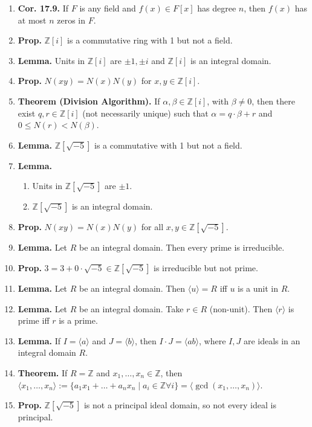 \begin{enumerate}
	\item \textbf{Cor. 17.9. } If $F$ is any field and $f(x) \in F[x]$ has degree $n$, then $f(x)$ has at most $n$ zeros in $F$. 
	\item \textbf{Prop. } $\mathbb{Z}[i]$ is a commutative ring with 1 but not a field. 	
	\item \textbf{Lemma. } Units in $\mathbb{Z}[i]$ are $\pm 1, \pm i$ and $\mathbb{Z}[i]$ is an integral domain. 	
	\item \textbf{Prop. } $N(xy)=N(x)N(y)$ for $x,y \in \mathbb{Z}[i]$. 
	\item \textbf{Theorem (Division Algorithm). } If $\alpha, \beta \in \mathbb{Z}[i]$, with $\beta \neq 0$, then there exist $q,r \in \mathbb{Z}[i]$ (not necessarily unique) such that $\alpha = q \cdot \beta + r$ and $0 \leq N(r) < N(\beta)$. 
	\item \textbf{Lemma. } $\mathbb{Z}[\sqrt{-5}]$ is a commutative with 1 but not a field. 
	\item \textbf{Lemma. } 
	\begin{enumerate}
		\item Units in $\mathbb{Z}[\sqrt{-5}]$ are $\pm 1$. 
		\item $\mathbb{Z}[\sqrt{-5}]$ is an integral domain. 
	\end{enumerate}
	\item \textbf{Prop. } $N(xy) = N(x)N(y)$ for all $x,y \in \mathbb{Z}[\sqrt{-5}]$. 
	\item \textbf{Lemma. } Let $R$ be an integral domain. Then every prime is irreducible. 
	\item \textbf{Prop. } $3 = 3 + 0 \cdot \sqrt{-5} \in \mathbb{Z}[\sqrt{-5}]$ is irreducible but not prime. 
	\item \textbf{Lemma. } Let $R$ be an integral domain. Then $\langle u \rangle = R$ iff $u$ is a unit in $R$. 
	\item \textbf{Lemma. } Let $R$ be an integral domain. Take $r \in R$ (non-unit). Then $\langle r \rangle$ is prime iff $r$ is a prime. 
	\item \textbf{Lemma. } If $I = \langle a \rangle$ and $J = \langle b \rangle$, then $I \cdot J = \langle ab \rangle$, where $I,J$ are ideals in an integral domain $R$. 
	\item \textbf{Theorem. } If $R = \mathbb{Z}$ and $x_1,\dots,x_n \in \mathbb{Z}$, then $\langle x_1,\dots,x_n \rangle := \{a_1x_1 + \dots + a_nx_n \mid a_i \in \mathbb{Z} \forall i\} = \langle \gcd(x_1,\dots,x_n) \rangle$. 
	\item \textbf{Prop. } $\mathbb{Z}[\sqrt{-5}]$ is not a principal ideal domain, so not every ideal is principal. 

\end{enumerate}
